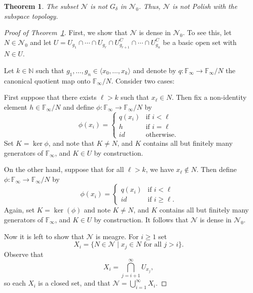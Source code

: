 \documentclass[10pt,a4paper]{amsart}
\newtheorem{theorem}{Theorem}
\begin{document}
\begin{theorem}
\label{thm : N not Polish}
    The subset $\mathcal{N}$ is not \(G_\delta\) in \(\mathcal{N}_0\). Thus, $\mathcal{N}$ is not Polish  with the subspace topology.
\end{theorem}

\begin{proof}[Proof of Theorem~\ref{thm : N not Polish}]
First, we show that $\mathcal{N}$ is dense in $\mathcal{N}_0$.  To see this, let $N \in \mathcal{N}_0$ and let \(U= U_{g_1}\cap \dotsb \cap U_{g_r}\cap U^C_{g_{r+1}}\cap \dotsb\cap U^C_{g_n}\) be a basic open set with \(N \in U\).

    Let \(k\in \mathbb{N}\) such that \(g_1,\dotsc, g_n\in \langle x_0,\dotsc, x_k \rangle \) and denote by \(q\colon \mathbb{F}_\infty \to \mathbb{F}_\infty/N\) the canonical quotient map onto \(\mathbb{F}_\infty/N\). Consider two cases:
    
    First suppose that there exists \(\ell >k\) such that \(x_\ell \in N\). Then
    fix a non-identity element $h \in \mathbb{F}_{\infty}/N$ and define $\phi \colon \mathbb{F}_{\infty} \rightarrow \mathbb{F}_{\infty}/N$ by 
    \[
\phi(x_i) =
\begin{cases}
    q(x_i) &\text{if $i < \ell$}\\
    h &\text{if $i = \ell$} \\
    id & \text{otherwise.}
\end{cases}
\]
Set $K = \ker \phi$, and note that $K \neq N$, and $K$ contains all but finitely many generators of $\mathbb{F}_\infty$, and \(K \in U\) by construction.  

On the other hand, suppose that for all $\ell >k$, we have $x_\ell \notin N$.  Then define $\phi \colon \mathbb{F}_{\infty} \rightarrow \mathbb{F}_{\infty}/N$ by 
    \[
\phi(x_i) =
\begin{cases}
    q(x_i) &\text{if $i < \ell$}\\
    id &\text{if $i \geq \ell$}. 
\end{cases}
\]
Again, set $K = \ker(\phi)$ and note $K \neq N$, and $K$ contains all but finitely many generators of $\mathbb{F}_\infty$, and \(K \in U\) by construction.  It follows that $\mathcal{N}$ is dense in $\mathcal{N}_0$.

Now it is left to show that \(\mathcal{N}\) is meagre. For $i \geq 1$ set 
$$
X_i = \{ N \in \mathcal{N} \mid x_j \in N \text{ for all } j>i \}.
$$
Observe that 
\[ X_i = \bigcap_{j=i+1}^\infty U_{x_j},
\]
so each $X_i$ is a closed set, and that $\mathcal{N} = \bigcup_{i=1}^\infty X_i$.  


\end{proof}
\end{document}
